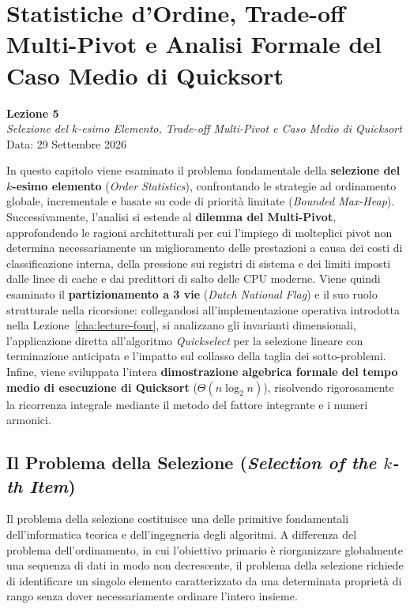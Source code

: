 \chapter{Statistiche d'Ordine, Trade-off Multi-Pivot e Analisi Formale del Caso Medio di Quicksort}
\label{cha:lecture-five}

\begin{center}
  \textbf{Lezione 5}\\
  \emph{Selezione del $k$-esimo Elemento, Trade-off Multi-Pivot e Caso Medio di Quicksort}\\[0.5em]
  Data: 29 Settembre 2026
\end{center}

In questo capitolo viene esaminato il problema fondamentale della \textbf{selezione del $k$-esimo elemento} (\textit{Order Statistics}), confrontando le strategie ad ordinamento globale, incrementale e basate su code di priorità limitate (\textit{Bounded Max-Heap}). Successivamente, l'analisi si estende al \textbf{dilemma del Multi-Pivot}, approfondendo le ragioni architetturali per cui l'impiego di molteplici pivot non determina necessariamente un miglioramento delle prestazioni a causa dei costi di classificazione interna, della pressione sui registri di sistema e dei limiti imposti dalle linee di cache e dai predittori di salto delle CPU moderne. Viene quindi esaminato il \textbf{partizionamento a 3 vie} (\textit{Dutch National Flag}) e il suo ruolo strutturale nella ricorsione: collegandosi all'implementazione operativa introdotta nella Lezione~\ref{cha:lecture-four}, si analizzano gli invarianti dimensionali, l'applicazione diretta all'algoritmo \textit{Quickselect} per la selezione lineare con terminazione anticipata e l'impatto sul collasso della taglia dei sotto-problemi. Infine, viene sviluppata l'intera \textbf{dimostrazione algebrica formale del tempo medio di esecuzione di Quicksort} ($\Theta(n \log_2 n)$), risolvendo rigorosamente la ricorrenza integrale mediante il metodo del fattore integrante e i numeri armonici.

\FloatBarrier
\section{Il Problema della Selezione (\textit{Selection of the \texorpdfstring{$k$}{k}-th Item})}
\label{sec:selection-problem}

Il problema della selezione costituisce una delle primitive fondamentali dell'informatica teorica e dell'ingegneria degli algoritmi. A differenza del problema dell'ordinamento, in cui l'obiettivo primario è riorganizzare globalmente una sequenza di dati in modo non decrescente, il problema della selezione richiede di identificare un singolo elemento caratterizzato da una determinata proprietà di rango senza dover necessariamente ordinare l'intero insieme.

